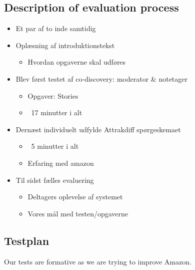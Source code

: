 \subsection{Description of evaluation process}
\begin{itemize}
\item Et par af to inde samtidig
\item Oplæsning af introduktionstekst
\begin{itemize}
\item Hvordan opgaverne skal udføres
\end{itemize}
\item Blev først testet af co-discovery: moderator \& notetager
\begin{itemize}
\item Opgaver: Stories
\item ~17 minutter i alt
\end{itemize}
\item Dern\ae st individuelt udfylde Attrakdiff spørgeskemaet
\begin{itemize}
\item ~5 minutter i alt
\item Erfaring med amazon
\end{itemize}
\item Til sidst fælles evaluering
\begin{itemize}
\item Deltagers oplevelse af systemet
\item Vores m\aa l med testen/opgaverne
\end{itemize}
\end{itemize}

\subsection{Testplan}
Our tests are formative as we are trying to improve Amazon.

